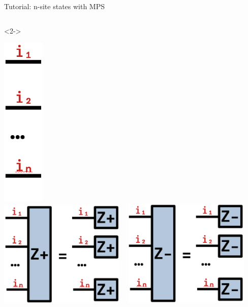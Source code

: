 \begin{frame}[fragile]{Tutorial: n-site states with MPS}
\begin{columns}
\begin{column}{5.5cm}
\begin{onlyenv}<2->
\vspace*{0.0cm}
\begin{center}
\includegraphics[width=0.15\textwidth]{
  slides/assets/in.png
} \\
\includegraphics[width=0.45\textwidth]{
  slides/assets/Zpn.png
} \ \ 
\includegraphics[width=0.45\textwidth]{
  slides/assets/Zmn.png
}
\end{center}
\vspace*{0.0cm}
\end{onlyenv}

\end{column}

\end{columns}

\end{frame}
